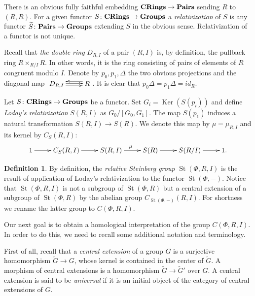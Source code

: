\documentclass[oneside, 8pt]{amsart}
\theoremstyle{remark}
\theoremstyle{definition}
\numberwithin{lemma}{section}
\numberwithin{prop}{section}
\numberwithin{corollary}{section}
\numberwithin{externaltheorem}{section}
\newtheorem{df}[lemma]{Definition} \Crefname{df}{Definition}{Definitions}
\DeclareMathOperator{\Ker}{Ker}
\DeclareMathOperator{\St}{St}
\newcommand{\catname}[1]{{\normalfont\textbf{#1}}} %
\numberwithin{equation}{section}
\begin{document}
There is an obvious fully faithful embedding $\catname{CRings} \to \catname{Pairs}$ sending $R$ to $(R, R)$. For a given functor $S \colon \catname{CRings} \to \catname{Groups}$ a {\it relativization} of $S$ is any functor $\widetilde{S} \colon \catname{Pairs} \to \catname{Groups}$ extending $S$ in the obvious sense. Relativization of a functor is not unique.

Recall that {\it the double ring} $D_{R, I}$ of a pair $(R, I)$ is, by definition, the pullback ring $R \times_{R/I} R$. In other words, it is the ring consisting of pairs of elements of $R$ congruent modulo $I$. Denote by $p_0, p_1, \Delta$ the two obvious projections and the diagonal map $\xymatrix{D_{R,I} \ar@<1pt>[r] \ar@<-2.5pt>[r] & \ar@<-4pt>[l] R}$. It is clear that $p_0 \Delta = p_1 \Delta = id_{R}$.

Let $S \colon \catname{CRings} \to \catname{Groups}$ be a functor. Set $G_i = \Ker(S(p_i))$ and define {\it Loday's relativization} $S(R, I)$ as $ G_0 / [G_0, G_1]$. The map $S(p_1)$ induces a natural transformation $S(R, I) \to S(R)$. We denote this map by $\mu = \mu_{R,I}$ and its kernel by $C_S(R, I)$: \begin{equation} \label{LodayRelativization} \xymatrix{ 1 \ar[r] & C_S(R, I) \ar[r] & S(R, I) \ar^{\mu}[r] & S(R) \ar[r] & S(R/I) \ar[r] & 1.} \end{equation}

\begin{df} By definition, the {\it relative Steinberg group} $\St(\Phi, R, I)$ is the result of application of Loday's relativization to the functor $\St(\Phi, -)$. Notice that $\St(\Phi, R, I)$ is not a subgroup of $\St(\Phi, R)$ but a central extension of a subgroup of $\St(\Phi, R)$ by the abelian group $C_{\St(\Phi, -)}(R, I)$. For shortness we rename the latter group to $C(\Phi, R, I)$. \end{df}

Our next goal is to obtain a homological interpretation of the group $C(\Phi, R, I)$.
In order to do this, we need to recall some additional notation and terminology.

First of all, recall that a {\it central extension} of a group $G$ is a surjective homomorphism $\widetilde{G} \to G$, whose kernel is contained in the center of $\widetilde{G}$. 
A morphism of central extensions is a homomorphism $\widetilde{G} \to \widetilde{G}'$ over $G$.
A central extension is said to be {\it universal} if it is an initial object of the category of central extensions of $G$.
\end{document}

